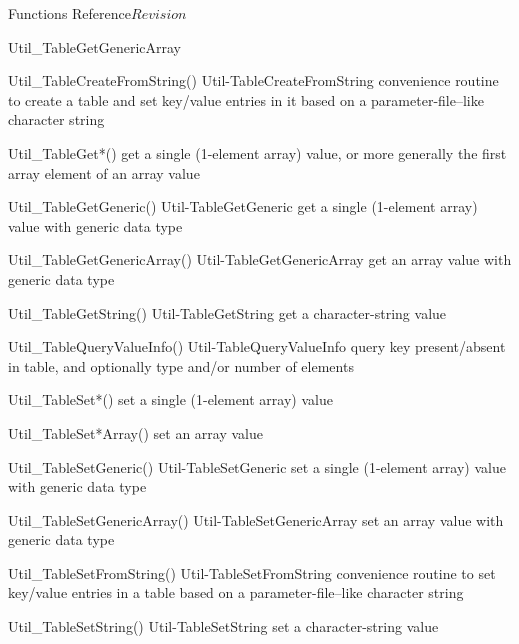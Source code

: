 \begin{cactuspart}{ Functions Reference}{}{$Revision$}
\begin{FunctionDescription}{Util\_TableGetGenericArray}
\begin{SeeAlsoSection}
\begin{SeeAlso2} {Util\_TableCreateFromString()} {Util-TableCreateFromString}
convenience routine to create a table and set key/value entries
in it based on a parameter-file--like character string
\end{SeeAlso2}
\begin{SeeAlso}{Util\_TableGet*()}
get a single (1-element array) value,
or more generally the first array element of an array value
\end{SeeAlso}
\begin{SeeAlso2} {Util\_TableGetGeneric()} {Util-TableGetGeneric}
get a single (1-element array) value with generic data type
\end{SeeAlso2}
\begin{SeeAlso2} {Util\_TableGetGenericArray()} {Util-TableGetGenericArray}
get an array value with generic data type
\end{SeeAlso2}
\begin{SeeAlso2} {Util\_TableGetString()} {Util-TableGetString}
get a character-string value
\end{SeeAlso2}
\begin{SeeAlso2} {Util\_TableQueryValueInfo()} {Util-TableQueryValueInfo}
query key present/absent in table, and optionally type and/or number
of elements
\end{SeeAlso2}
\begin{SeeAlso}{Util\_TableSet*()}
set a single (1-element array) value
\end{SeeAlso}
\begin{SeeAlso}{Util\_TableSet*Array()}
set an array value
\end{SeeAlso}
\begin{SeeAlso2} {Util\_TableSetGeneric()} {Util-TableSetGeneric}
set a single (1-element array) value with generic data type
\end{SeeAlso2}
\begin{SeeAlso2} {Util\_TableSetGenericArray()} {Util-TableSetGenericArray}
set an array value with generic data type
\end{SeeAlso2}
\begin{SeeAlso2} {Util\_TableSetFromString()} {Util-TableSetFromString}
convenience routine to set key/value entries in a table based on a
parameter-file--like character string
\end{SeeAlso2}
\begin{SeeAlso2} {Util\_TableSetString()} {Util-TableSetString}
set a character-string value
\end{SeeAlso2}
\end{SeeAlsoSection}


\end{FunctionDescription}
\end{cactuspart}

